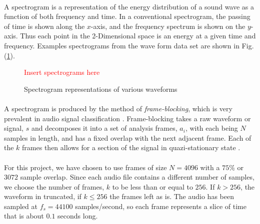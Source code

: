 \documentclass[12pt,letterpaper]{article}
\begin{document}
\paragraph*{}A spectrogram is a representation of the energy distribution of a sound wave as a function of both frequency and time. In a conventional spectrogram, the passing of time is shown along the $x$-axis, and the frequency spectrum is shown on the $y$-axis. Thus each point in the 2-Dimensional space is an energy at a given time and frequency. Examples spectrograms from the wave form data set are shown in Fig. (\ref{fig-spectrograms}).

\begin{figure}[H]
\begin{center}
\label{fig-spectrograms}
\textcolor{red}{Insert spectrograms here}
\caption{Spectrogram representations of various waveforms}
\end{center}
\end{figure}

\paragraph*{}A spectrogram is produced by the method of \textit{frame-blocking}, which is very prevalent in audio signal classification \cite{Liu,Zhang}. Frame-blocking takes a raw waveform or signal, $s$ and decomposes it into a set of analysis frames, $a_i$, with each being $N$ samples in length, and has a fixed overlap with the next adjacent frame. Each of the $k$ frames then allows for a section of the signal in quazi-stationary state \cite{Kahn,Serizel}. 

\paragraph*{}For this project, we have chosen to use frames of size $N = 4096$ with a $75\%$ or $3072$ sample overlap. Since each audio file contains a different number of samples, we choose the number of frames, $k$ to be less than or equal to $256$. If $k > 256$, the waveform in truncated, if $k \leq 256$ the frames left as is. The audio has been sampled at $f_s = 44100$ samples/second, so each frame represents a slice of time that is about $0.1$ seconds long.
\end{document}
